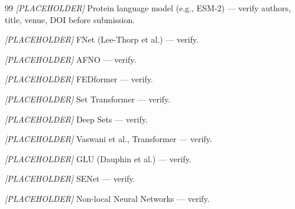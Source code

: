 \documentclass[11pt]{article}
\begin{document}
\begin{thebibliography}{99}
\textit{[PLACEHOLDER]} Protein language model (e.g., ESM-2) --- verify authors, title, venue, DOI before submission.

\textit{[PLACEHOLDER]} FNet (Lee-Thorp et al.) --- verify.

\textit{[PLACEHOLDER]} AFNO --- verify.

\textit{[PLACEHOLDER]} FEDformer --- verify.

\textit{[PLACEHOLDER]} Set Transformer --- verify.

\textit{[PLACEHOLDER]} Deep Sets --- verify.

\textit{[PLACEHOLDER]} Vaswani et al., Transformer --- verify.

\textit{[PLACEHOLDER]} GLU (Dauphin et al.) --- verify.

\textit{[PLACEHOLDER]} SENet --- verify.

\textit{[PLACEHOLDER]} Non-local Neural Networks --- verify.
\end{thebibliography}
\end{document}
